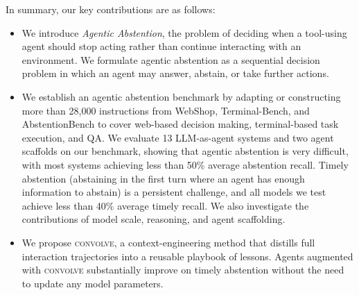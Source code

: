 \documentclass{article}
\newcommand{\method}{\textsc{convolve}\xspace}
\begin{document}
In summary, our key contributions are as follows:

\begin{itemize}[leftmargin=12pt, topsep=0pt, itemsep=0pt]

    \item We introduce \emph{Agentic Abstention}, the problem of deciding when a tool-using agent should stop acting rather than continue interacting with an environment. We formulate agentic abstention as a sequential decision problem in which an agent may answer, abstain, or take further actions.

    \item We establish an agentic abstention benchmark by adapting or constructing more than 28,000 instructions from WebShop, Terminal-Bench, and AbstentionBench to cover web-based decision making, terminal-based task execution, and QA. We evaluate 13 LLM-as-agent systems and two agent scaffolds on our benchmark, showing that agentic abstention is very difficult, with most systems achieving less than 50\% average abstention recall. 
    Timely abstention (abstaining in the first turn where an agent has enough information to abstain) is a persistent challenge, and all models we test achieve less than 40\% average timely recall. We also investigate the contributions of model scale, reasoning, and agent scaffolding.

    \item We propose \method, a context-engineering method that distills full interaction trajectories into a reusable playbook of lessons. Agents augmented with \method substantially improve on timely abstention without the need to update any model parameters.
\end{itemize}






\end{document}
